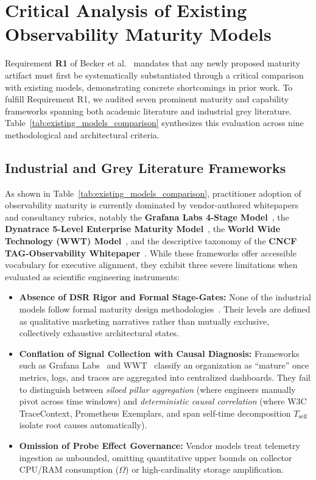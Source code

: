 \section{Critical Analysis of Existing Observability Maturity Models}
\label{sec:critical_analysis}

Requirement \textbf{R1} of Becker et al.~\cite{becker_2009} mandates that any newly proposed maturity artifact must first be systematically substantiated through a critical comparison with existing models, demonstrating concrete shortcomings in prior work. To fulfill Requirement R1, we audited seven prominent maturity and capability frameworks spanning both academic literature and industrial grey literature. Table~\ref{tab:existing_models_comparison} synthesizes this evaluation across nine methodological and architectural criteria.



\subsection{Industrial and Grey Literature Frameworks}
\label{subsec:industrial_models}

As shown in Table~\ref{tab:existing_models_comparison}, practitioner adoption of observability maturity is currently dominated by vendor-authored whitepapers and consultancy rubrics, notably the \textbf{Grafana Labs 4-Stage Model}~\cite{grafana_omm_2024}, the \textbf{Dynatrace 5-Level Enterprise Maturity Model}~\cite{dynatrace_omm_2024}, the \textbf{World Wide Technology (WWT) Model}~\cite{wwt_omm_2025}, and the descriptive taxonomy of the \textbf{CNCF TAG-Observability Whitepaper}~\cite{cncf_obs_2024}. While these frameworks offer accessible vocabulary for executive alignment, they exhibit three severe limitations when evaluated as scientific engineering instruments:
\begin{itemize}[leftmargin=*, nosep]
    \item \textbf{Absence of DSR Rigor and Formal Stage-Gates:} None of the industrial models follow formal maturity design methodologies~\cite{becker_2009, debruin_2005}. Their levels are defined as qualitative marketing narratives rather than mutually exclusive, collectively exhaustive architectural states.
    \item \textbf{Conflation of Signal Collection with Causal Diagnosis:} Frameworks such as Grafana Labs~\cite{grafana_omm_2024} and WWT~\cite{wwt_omm_2025} classify an organization as ``mature'' once metrics, logs, and traces are aggregated into centralized dashboards. They fail to distinguish between \textit{siloed pillar aggregation} (where engineers manually pivot across time windows) and \textit{deterministic causal correlation} (where W3C TraceContext, Prometheus Exemplars, and span self-time decomposition $T_{\text{self}}$ isolate root causes automatically).
    \item \textbf{Omission of Probe Effect Governance:} Vendor models treat telemetry ingestion as unbounded, omitting quantitative upper bounds on collector CPU/RAM consumption ($\Omega$) or high-cardinality storage amplification.
\end{itemize}

